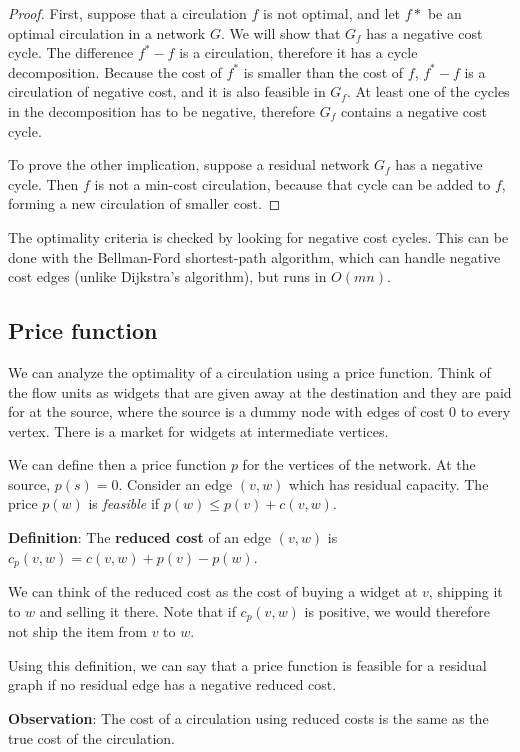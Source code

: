 \documentclass{article}
\begin{document}
\begin{proof}
First, suppose that a circulation $f$ is not optimal, and let $f*$ be an optimal circulation in a network $G$. We will show that $G_f$ has a negative cost cycle. 
The difference $f^* - f$ is a circulation, therefore it has a cycle decomposition. Because the cost of $f^*$ is smaller than the cost of $f$, $f^* - f$ is a circulation of negative cost, and it is also feasible in $G_f$. At least one of the cycles in the decomposition has to be negative, therefore $G_f$ contains a negative cost cycle.

To prove the other implication, suppose a residual network $G_f$ has a negative cycle. Then $f$ is not a min-cost circulation, because that cycle can be added to $f$, forming a new circulation of smaller cost. 
\end{proof}

The optimality criteria is checked by looking for negative cost cycles. This can be done with the Bellman-Ford shortest-path algorithm, which can handle negative cost edges (unlike Dijkstra's algorithm), but runs in $O(mn)$. 

\subsection{Price function}
We can analyze the optimality of a circulation using a price function. Think of the flow units as widgets that are given away at the destination and they are paid for at the source, where the source is a dummy node with edges of cost $0$ to every vertex. There is a market for widgets at intermediate vertices. 

We can define then a price function $p$ for the vertices of the network. At the source, $p(s) = 0$. Consider an edge $(v, w)$ which has residual capacity. The price $p(w)$ is \emph{feasible} if $p(w) \leq p(v) + c(v, w)$.  

    \textbf{Definition}:
    The {\bf reduced cost} of an edge $(v, w)$ is $c_p(v, w) = c(v, w) + p(v) - p(w)$.

We can think of the reduced cost as the cost of buying a widget at $v$, shipping it to $w$ and selling it there.  Note that if $c_p(v,w)$ is positive, we would therefore not ship the item from $v$ to $w$.

Using this definition, we can say that a price function is feasible for a residual graph if no residual edge has a negative reduced cost. 

\textbf{Observation}:
The cost of a circulation using reduced costs is the same as the true cost of the circulation.
\end{document}
